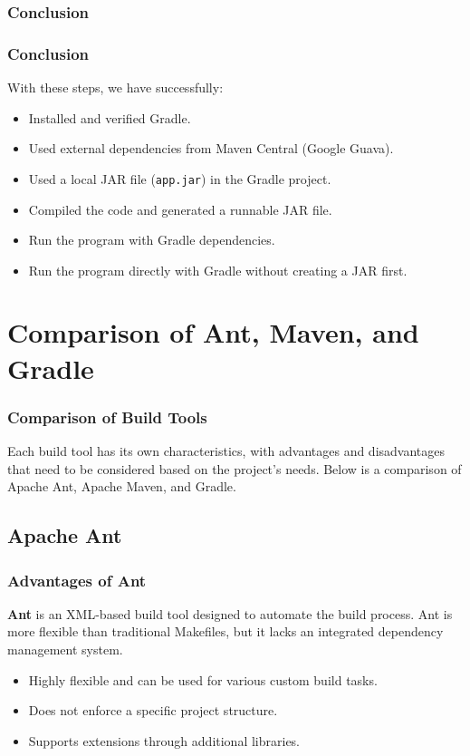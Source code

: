 \documentclass[aspectratio=169, table]{beamer}
\begin{document}
\subsubsection{Conclusion}
\begin{frame}[fragile]
	\frametitle{Conclusion}
	With these steps, we have successfully:
	\begin{itemize}
		\item Installed and verified Gradle.
		\item Used external dependencies from Maven Central (Google Guava).
		\item Used a local JAR file (\texttt{app.jar}) in the Gradle project.
		\item Compiled the code and generated a runnable JAR file.
		\item Run the program with Gradle dependencies.
		\item Run the program directly with Gradle without creating a JAR first.
	\end{itemize}
\end{frame}

\section{Comparison of Ant, Maven, and Gradle}
\begin{frame}[fragile]
	\frametitle{Comparison of Build Tools}
	Each build tool has its own characteristics, with advantages and disadvantages that need to be considered based on the project's needs. Below is a comparison of Apache Ant, Apache Maven, and Gradle.
\end{frame}


\subsection{Apache Ant}

\begin{frame}[fragile]
	\frametitle{Advantages of Ant}
	\textbf{Ant} is an XML-based build tool designed to automate the build process. Ant is more flexible than traditional Makefiles, but it lacks an integrated dependency management system.
	\begin{itemize}
		\item Highly flexible and can be used for various custom build tasks.
		\item Does not enforce a specific project structure.
		\item Supports extensions through additional libraries.
	\end{itemize}
\end{frame}
\end{document}
